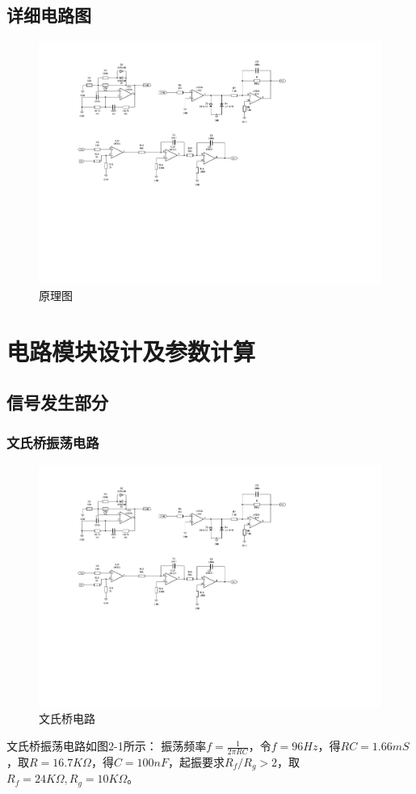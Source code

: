 \documentclass[a4paper]{article}
\theoremstyle{definition}
\theoremstyle{plain}
\theoremstyle{remark}
\begin{document}
\subsection{详细电路图}
\begin{figure}[H]
	\centering
	\includegraphics[width=1\textwidth]{原理图}
	\caption{原理图}
\end{figure}

\section{电路模块设计及参数计算}
\subsection{信号发生部分}
\subsubsection{文氏桥振荡电路}
\begin{figure}[H]
	\centering
	\includegraphics[width=1.0\textwidth]{文氏桥}
	\caption{文氏桥电路}
\end{figure}
\noindent 文氏桥振荡电路如图2-1所示：
振荡频率$f=\frac{1}{2\pi RC}$，令$f =96Hz$，得$RC=1.66mS$，取$R=16.7K\Omega$，得$C=100nF$，起振要求$R_f/R_g>2$，取$R_f=24K\Omega,R_g=10K\Omega$。
\end{document}
